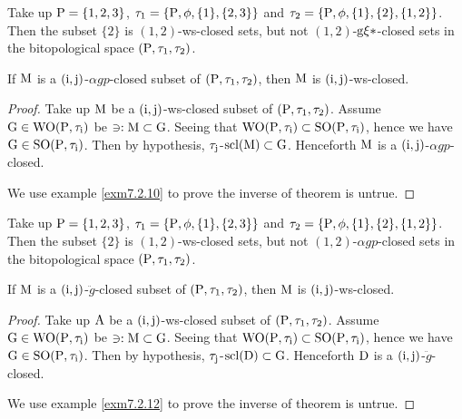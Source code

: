 \begin{exm}\label{exm7.2.8} 
Take up $\mathrm{P}= \{1,2,3\}$, $\tau_1 =\{\mathrm{P}, \phi, \{1\}, \{2,3\}\}$ and $\tau_2 =\{\TSP, \phi, \{1\},\break \{2\}, \{1, 2\}\}$. Then the subset $\{2\}$ is $(1, 2)$-ws-closed sets, but not $(1, 2)$-$\mathrm{g}\xi*$-closed sets in the bitopological space $(\mathrm{P}, \tau_1, \tau_2 )$.
\end{exm}

\begin{thm}\label{thm7.2.9}
If $\mathrm{M}$ is a $(\mathrm{i}, \mathrm{j})$-$\alpha gp$-closed subset of $(\mathrm{P}, \tau_1, \tau_2)$, then $\mathrm{M}$ is $(\mathrm{i}, \mathrm{j})$-ws-closed.
\end{thm}

\begin{proof}
Take up $\mathrm{M}$ be a $(\mathrm{i}, \mathrm{j})$-ws-closed subset of $(\mathrm{P}, \tau_1, \tau_2)$. Assume $\mathrm{G}\in\mathrm{W}\mathrm{O}(\mathrm{P}, \tau_{\mathrm{i}})$ be $\ni: \mathrm{M} \subset \mathrm{G}$. Seeing that $\mathrm{W}\mathrm{O}(\mathrm{P}, \tau_{\mathrm{i}}) \subset \mathrm{S}\mathrm{O}(\mathrm{P}, \tau_{\mathrm{i}})$, hence we have $\mathrm{G}\in\mathrm{S}\mathrm{O}(\mathrm{P}, \tau_{\mathrm{i}})$. Then by hypothesis, $\tau_{\mathrm{j}}$-$
\mathrm{scl}(\mathrm{M}) \subset \mathrm{G}$. Henceforth $\mathrm{M}$ is a $(\mathrm{i}, \mathrm{j})$-$\alpha gp$-closed.

We use example \ref{exm7.2.10} to prove the inverse of theorem is untrue.
\end{proof}

\begin{exm}\label{exm7.2.10}
Take up $\mathrm{P}= \{1,2,3\}$, $\tau_1 =\{\mathrm{P}, \phi, \{1\}, \{2,3\}\}$ and $\tau_2 =\{\TSP, \phi, \{1\},\break \{2\}, \{1, 2\}\}$. Then the subset $\{2\}$ is $(1, 2)$-ws-closed sets, but not $(1, 2)$-$\alpha gp$-closed sets in the bitopological space $(\mathrm{P}, \tau_1, \tau_2 )$.
\end{exm}

\begin{thm}\label{thm7.2.11}
If $\mathrm{M}$ is a $(\mathrm{i}, \mathrm{j})$-$\ddot{g}$-closed subset of $(\mathrm{P}, \tau_1, \tau_2)$, then $\mathrm{M}$ is $(\mathrm{i}, \mathrm{j})$-ws-closed.
\end{thm}

\begin{proof}
Take up $\mathrm{A}$ be a $(\mathrm{i}, \mathrm{j})$-ws-closed subset of $(\mathrm{P}, \tau_1, \tau_2 )$. Assume $\mathrm{G}\in\mathrm{W}\mathrm{O}(\mathrm{P}, \tau_{\mathrm{i}} )$ be $\ni: \mathrm{M} \subset \mathrm{G}$. Seeing that $\mathrm{W}\mathrm{O}(\mathrm{P}, \tau_{\mathrm{i}} ) \subset \mathrm{S}\mathrm{O}(\mathrm{P}, \tau_{\mathrm{i}} )$, hence we have $\mathrm{G}\in\mathrm{S}\mathrm{O}(\mathrm{P}, \tau_{\mathrm{i}} )$. Then by hypothesis, $\tau_{\mathrm{j}}$-$\mathrm{scl}(\mathrm{D}) \subset \mathrm{G}$. Henceforth $\mathrm{D}$ is a $(\mathrm{i}, \mathrm{j})$-$\ddot{g}$-closed.

We use example \ref{exm7.2.12} to prove the inverse of theorem is untrue.
\end{proof}

